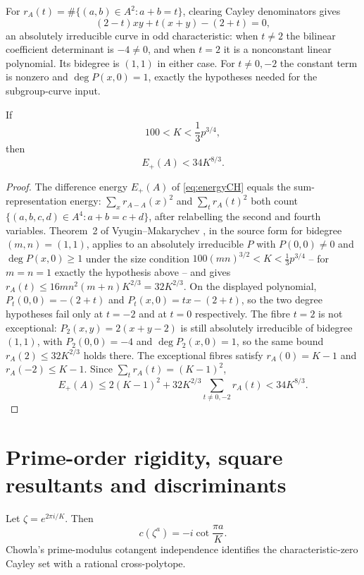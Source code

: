 For $r_A(t)=\#\{(a,b)\in A^2:a+b=t\}$, clearing Cayley denominators gives
\[
(2-t)xy+t(x+y)-(2+t)=0,
\]
an absolutely irreducible curve in odd characteristic: when $t\ne2$ the
bilinear coefficient determinant is $-4\ne0$, and when $t=2$ it is a
nonconstant linear polynomial. Its bidegree is $(1,1)$ in either case.
For $t\ne0,-2$ the constant term is nonzero and $\deg P(x,0)=1$, exactly
the hypotheses needed for the subgroup-curve input.

\begin{theorem}\label{thm:direct}
If
\[
100<K<\frac13p^{3/4},
\]
then
\begin{equation}\label{eq:direct}
E_+(A)<34K^{8/3}.
\end{equation}
\end{theorem}

\begin{proof}
The difference energy $E_+(A)$ of \eqref{eq:energyCH} equals the
sum-representation energy: $\sum_xr_{A-A}(x)^2$ and $\sum_tr_A(t)^2$ both
count $\{(a,b,c,d)\in A^4:a+b=c+d\}$, after relabelling the second and
fourth variables.
Theorem~2 of Vyugin--Makarychev \cite{VM2015,MV2019}, in the source form for
bidegree $(m,n)=(1,1)$, applies to an absolutely irreducible $P$ with
$P(0,0)\ne0$ and $\deg P(x,0)\ge1$ under the size condition
$100(mn)^{3/2}<K<\frac13p^{3/4}$ -- for $m=n=1$ exactly the hypothesis above --
and gives $r_A(t)\le16mn^2(m+n)K^{2/3}=32K^{2/3}$.  On the displayed
polynomial, $P_t(0,0)=-(2+t)$ and $P_t(x,0)=tx-(2+t)$, so the two degree
hypotheses fail only at $t=-2$ and at $t=0$ respectively.  The fibre $t=2$
is not exceptional: $P_2(x,y)=2(x+y-2)$ is still absolutely irreducible of
bidegree $(1,1)$, with $P_2(0,0)=-4$ and $\deg P_2(x,0)=1$, so the same
bound $r_A(2)\le32K^{2/3}$ holds there.  The exceptional fibres satisfy
$r_A(0)=K-1$ and $r_A(-2)\le K-1$.  Since
$\sum_tr_A(t)=(K-1)^2$,
\[
E_+(A)
\le2(K-1)^2+32K^{2/3}\sum_{t\ne0,-2}r_A(t)
<34K^{8/3}.
\]
\end{proof}

\section{Prime-order rigidity, square resultants and discriminants}

Let $\zeta=e^{2\pi i/K}$.  Then
\[
c(\zeta^a)=-i\cot\frac{\pi a}{K}.
\]
Chowla's prime-modulus cotangent independence \cite{Chowla1970,Wang1982}
identifies the characteristic-zero Cayley set with a rational cross-polytope.

